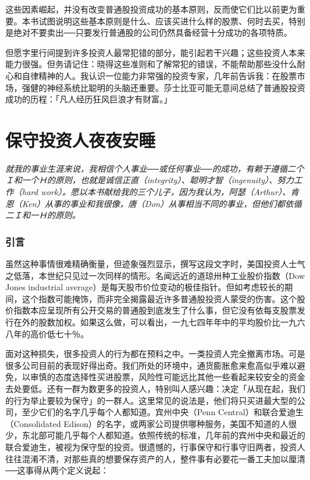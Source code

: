 \documentclass[UTF8,a4paper,zihao=-4,fontset = windows]{ctexart} %
\begin{document}
这些因素崛起，并没有改变普通股投资成功的基本原则，反而使它们比以前更为重要。本书试图说明这些基本原则是什么、应该买进什么样的股票、何时去买，特别是绝对不要卖出──只要发行普通股的公司仍然具备经营十分成功的各项特质。

但愿字里行间提到许多投资人最常犯错的部分，能引起若干兴趣；这些投资人本来能力很强。但务请记住：晓得这些准则和了解常犯的错误，不能帮助那些没什么耐心和自律精神的人。我认识一位能力非常强的投资专家，几年前告诉我：在股票市场，强健的神经系统比聪明的头脑还重要。莎士比亚可能无意间总结了普通股投资成功的历程：「凡人经历狂风巨浪才有财富。」
\newpage

\part{保守投资人夜夜安睡}


\textit{就我的事业生涯来说，我相信个人事业──或任何事业──的成功，有赖于遵循二个Ｉ和一个Ｈ的原则，也就是诚信正直（integrity）、聪明才智（ingenuity）、努力工作（hard work）。愿以本书献给我的三个儿子，因为我认为，阿瑟（Arthur）、肯恩（Ken）从事的事业和我很像，唐（Don）从事相当不同的事业，但他们都依循二Ｉ和一Ｈ的原则。}

\section{引言}

虽然这种事情很难精确衡量，但迹象强烈显示，撰写这段文字时，美国投资人士气之低落，本世纪只见过一次同样的情形。名闻远近的道琼卅种工业股价指数（Dow Jones industrial average）是每天股市价位变动的极佳指针。但如考虑较长的期间，这个指数可能掩饰，而非完全揭露最近许多普通股投资人蒙受的伤害。这个股价指数本应呈现所有公开交易的普通股到底发生了什么事，但它没有依每支股票发行在外的股数加权。如果这么做，可以看出，一九七四年年中的平均股价比一九六八年的高价低七十％。

面对这种损失，很多投资人的行为都在预料之中。一类投资人完全撤离市场。可是很多公司目前的表现好得出奇。我们所处的环境中，通货膨胀愈来愈高似乎难以避免，以审慎的态度选择性买进股票，风险性可能远比其他一些看起来较安全的资金去处要低。还有一群为数更多的投资人，特别叫人感兴趣：决定「从现在起，我们的行为举止要较为保守」的一群人。这里常见的说法是，他们将只买进最大型的公司，至少它们的名字几乎每个人都知道。宾州中央（Penn Central）和联合爱迪生（Consolidated Edison）的名字，或两家公司提供哪种服务，美国不知道的人很少，东北部可能几乎每个人都知道。依照传统的标准，几年前的宾州中央和最近的联合爱迪生，被视为保守型的投资。很遗憾的，行事保守和行事守旧两者，投资人往往混淆不清，对那些真的想要保存资产的人，整件事有必要花一番工夫加以厘清──这事得从两个定义说起：
\end{document}
